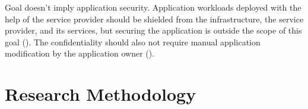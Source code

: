 Goal  doesn't imply application security. Application workloads
deployed with the help of the service provider should be shielded from the
infrastructure, the service provider, and its services, but securing the
application is outside the scope of this goal (). The
confidentiality should also not require manual application modification by the
application owner ().

\section{Research Methodology}
\label{sec:research-methodology}
